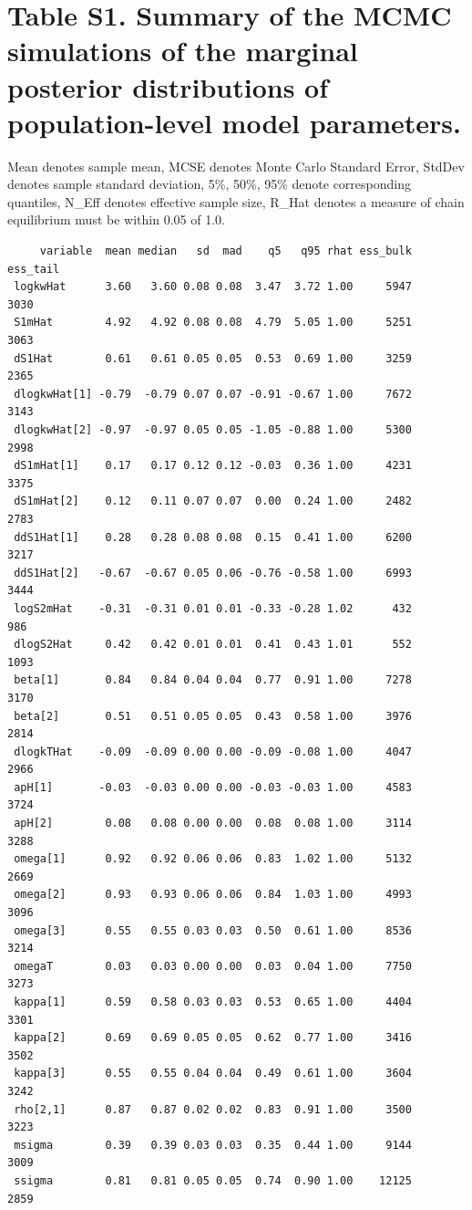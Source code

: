 \documentclass[
]{article}
\begin{document}
\newpage{}

\hypertarget{table-s1.-summary-of-the-mcmc-simulations-of-the-marginal-posterior-distributions-of-population-level-model-parameters.}{%
\section{Table S1. Summary of the MCMC simulations of the marginal
posterior distributions of population-level model
parameters.}\label{table-s1.-summary-of-the-mcmc-simulations-of-the-marginal-posterior-distributions-of-population-level-model-parameters.}}

Mean denotes sample mean, MCSE denotes Monte Carlo Standard Error,
StdDev denotes sample standard deviation, 5\%, 50\%, 95\% denote
corresponding quantiles, N\_Eff denotes effective sample size, R\_Hat
denotes a measure of chain equilibrium must be within 0.05 of 1.0.

\begin{verbatim}
     variable  mean median   sd  mad    q5   q95 rhat ess_bulk ess_tail
 logkwHat      3.60   3.60 0.08 0.08  3.47  3.72 1.00     5947     3030
 S1mHat        4.92   4.92 0.08 0.08  4.79  5.05 1.00     5251     3063
 dS1Hat        0.61   0.61 0.05 0.05  0.53  0.69 1.00     3259     2365
 dlogkwHat[1] -0.79  -0.79 0.07 0.07 -0.91 -0.67 1.00     7672     3143
 dlogkwHat[2] -0.97  -0.97 0.05 0.05 -1.05 -0.88 1.00     5300     2998
 dS1mHat[1]    0.17   0.17 0.12 0.12 -0.03  0.36 1.00     4231     3375
 dS1mHat[2]    0.12   0.11 0.07 0.07  0.00  0.24 1.00     2482     2783
 ddS1Hat[1]    0.28   0.28 0.08 0.08  0.15  0.41 1.00     6200     3217
 ddS1Hat[2]   -0.67  -0.67 0.05 0.06 -0.76 -0.58 1.00     6993     3444
 logS2mHat    -0.31  -0.31 0.01 0.01 -0.33 -0.28 1.02      432      986
 dlogS2Hat     0.42   0.42 0.01 0.01  0.41  0.43 1.01      552     1093
 beta[1]       0.84   0.84 0.04 0.04  0.77  0.91 1.00     7278     3170
 beta[2]       0.51   0.51 0.05 0.05  0.43  0.58 1.00     3976     2814
 dlogkTHat    -0.09  -0.09 0.00 0.00 -0.09 -0.08 1.00     4047     2966
 apH[1]       -0.03  -0.03 0.00 0.00 -0.03 -0.03 1.00     4583     3724
 apH[2]        0.08   0.08 0.00 0.00  0.08  0.08 1.00     3114     3288
 omega[1]      0.92   0.92 0.06 0.06  0.83  1.02 1.00     5132     2669
 omega[2]      0.93   0.93 0.06 0.06  0.84  1.03 1.00     4993     3096
 omega[3]      0.55   0.55 0.03 0.03  0.50  0.61 1.00     8536     3214
 omegaT        0.03   0.03 0.00 0.00  0.03  0.04 1.00     7750     3273
 kappa[1]      0.59   0.58 0.03 0.03  0.53  0.65 1.00     4404     3301
 kappa[2]      0.69   0.69 0.05 0.05  0.62  0.77 1.00     3416     3502
 kappa[3]      0.55   0.55 0.04 0.04  0.49  0.61 1.00     3604     3242
 rho[2,1]      0.87   0.87 0.02 0.02  0.83  0.91 1.00     3500     3223
 msigma        0.39   0.39 0.03 0.03  0.35  0.44 1.00     9144     3009
 ssigma        0.81   0.81 0.05 0.05  0.74  0.90 1.00    12125     2859
\end{verbatim}
\end{document}
